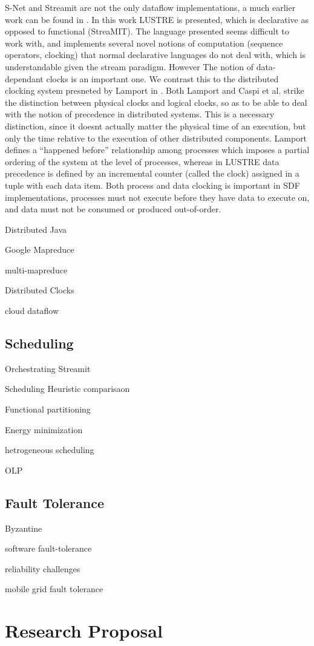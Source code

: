 S-Net and Streamit are not the only dataflow implementations, a much earlier work can be found in \cite{cas87}.
In this work LUSTRE is presented, which is declarative as opposed to functional (StreaMIT).
The language presented seems difficult to work with, and implements several novel notions of computation (sequence operators, clocking) that normal declarative languages do not deal with, which is understandable given the stream paradigm.
However The notion of data-dependant clocks is an important one.
We contrast this to the distributed clocking system presneted by Lamport in \cite{lam78}.
Both Lamport and Caspi et al. strike the distinction between physical clocks and logical clocks, so as to be able to deal with the notion of precedence in distributed systems.
This is a necessary distinction, since it doesnt actually matter the physical time of an execution, but only the time relative to the execution of other distributed components.
Lamport defines a ``happened before'' relationship among processes which imposes a partial ordering of the system at the level of processes, whereas in LUSTRE data precedence is defined by an incremental counter (called the clock) assigned in a tuple with each data item.
Both process and data clocking is important in SDF implementations, processes must not execute before they have data to execute on, and data must not be consumed or produced out-of-order.



Distributed Java \cite{par03}

Google Mapreduce \cite{dea08}

multi-mapreduce \cite{ran07}

Distributed Clocks \cite{lam78}

cloud dataflow \cite{tsa09}

\subsection*{Scheduling}

Orchestrating Streamit \cite{mal08}

Scheduling Heuristic comparisaon \cite{Kha94}

Functional partitioning \cite{li10}

Energy minimization \cite{boy01}

hetrogeneous scheduling \cite{len87}

OLP \cite{hen99}

\subsection*{Fault Tolerance}

Byzantine \cite{lam86}

software fault-tolerance \cite{ran75}

reliability challenges \cite{ree06}

mobile grid fault tolerance\cite{lit07}

\section*{Research Proposal}





